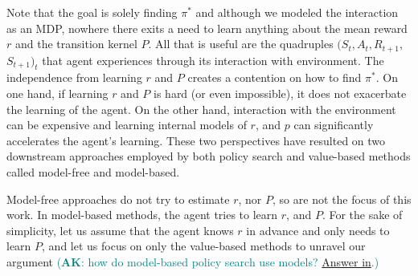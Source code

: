 \documentclass[a4paper]{article}
\theoremstyle{definition}
\newcommand{\AK}[1]{\textcolor{teal}{(\textbf{AK}: {#1})}}
\begin{document}
%
Note that the goal is solely finding $\pi^*$ and although we modeled the interaction as an MDP, nowhere there exits a need to learn anything about the mean reward $r$ and the transition kernel $P$. All that is useful are the quadruples $(S_t, A_t, R_{t+1}$, $S_{t+1})_t$ that agent experiences through its interaction with environment. The independence from learning $r$ and $P$ creates a contention on how to find $\pi^*$. On one hand, if learning $r$ and $P$ is hard (or even impossible), it does not exacerbate the learning of the agent. On the other hand, interaction with the environment can be expensive and learning internal models of $r$, and $p$ can significantly accelerates the agent's learning. These two perspectives have resulted on two downstream approaches employed by both policy search and value-based methods called model-free and model-based.

Model-free approaches do not try to estimate $r$, nor $P$, so are not the focus of this work. In model-based methods, the agent tries to learn $r$, and $P$. For the sake of simplicity, let us assume that the agent knows $r$ in advance and only needs to learn $P$, and let us focus on only the value-based methods to unravel our argument \AK{how do model-based policy search use models? \href{https://icml.cc/2015/tutorials/PolicySearch.pdf}{Answer in}.}
\end{document}
